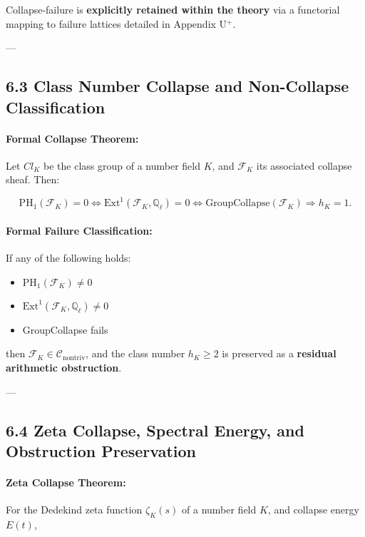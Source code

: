 \documentclass[11pt]{article}
\begin{document}
Collapse-failure is \textbf{explicitly retained within the theory} via a functorial mapping to failure lattices detailed in Appendix U$^{+}$.

---

\subsection*{6.3 Class Number Collapse and Non-Collapse Classification}

\paragraph{Formal Collapse Theorem:}
Let \( Cl_K \) be the class group of a number field \( K \), and \( \mathcal{F}_K \) its associated collapse sheaf. Then:

\[
\mathrm{PH}_1(\mathcal{F}_K) = 0 \iff \mathrm{Ext}^1(\mathcal{F}_K, \mathbb{Q}_\ell) = 0 \iff \mathrm{GroupCollapse}(\mathcal{F}_K) \Rightarrow h_K = 1.
\]

\paragraph{Formal Failure Classification:}
If any of the following holds:

\begin{itemize}
    \item \( \mathrm{PH}_1(\mathcal{F}_K) \neq 0 \)
    \item \( \mathrm{Ext}^1(\mathcal{F}_K, \mathbb{Q}_\ell) \neq 0 \)
    \item GroupCollapse fails
\end{itemize}

then \( \mathcal{F}_K \in \mathcal{C}_{\mathrm{nontriv}} \), and the class number \( h_K \geq 2 \) is preserved as a \textbf{residual arithmetic obstruction}.

---

\subsection*{6.4 Zeta Collapse, Spectral Energy, and Obstruction Preservation}

\paragraph{Zeta Collapse Theorem:}
For the Dedekind zeta function \( \zeta_K(s) \) of a number field \( K \), and collapse energy \( E(t) \),
\end{document}
